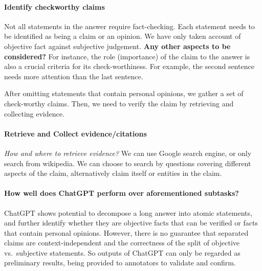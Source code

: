 \documentclass[11pt]{article}
\begin{document}
\paragraph{Identify check\-worthy claims}
Not all statements in the answer require fact-checking. 
Each statement needs to be identified as being a claim or an opinion.
We have only taken account of objective fact against subjective judgement.
\textbf{Any other aspects to be considered?}
For instance, the role (importance) of the claim to the answer is also a crucial criteria for its check-worthiness.
For example, the second sentence needs more attention than the last sentence.

After omitting statements that contain personal opinions, we gather a set of check-worthy claims.
Then, we need to verify the claim by retrieving and collecting evidence.

\paragraph{Retrieve and Collect evidence/citations}
\textit{How and where to retrieve evidence?}
We can use Google search engine, or only search from wikipedia.
We can choose to search by questions covering different aspects of the claim, alternatively claim itself or entities in the claim.

\paragraph{How well does ChatGPT perform over aforementioned subtasks?}
ChatGPT shows potential to decompose a long answer into atomic statements, and further identify whether they are objective facts that can be verified or facts that contain personal opinions.
However, there is no guarantee that separated claims are context-independent and the correctness of the split of objective vs.\ subjective statements.
So outputs of ChatGPT can only be regarded as preliminary results, being provided to annotators to validate and confirm. 
\end{document}
